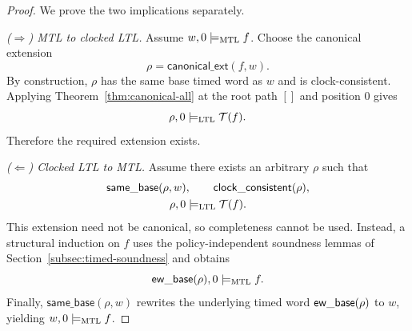 \begin{proof}
We prove the two implications separately.

\smallskip
\noindent\emph{($\Rightarrow$) MTL to clocked LTL.}
Assume $w,0\models_{\mathrm{MTL}} f$.  Choose the canonical extension
\[
  \rho=\mathsf{canonical\_ext}(f,w).
\]
By construction, $\rho$ has the same base timed word as $w$ and is
clock-consistent. Applying Theorem~\ref{thm:canonical-all} at the root path $[]$ and
position $0$ gives
\[
  \rho,0\models_{\mathrm{LTL}}\mathcal{T}(f).
\]
Therefore the required extension exists.

\smallskip
\noindent\emph{($\Leftarrow$) Clocked LTL to MTL.}
Assume there exists an arbitrary $\rho$ such that
\[
\begin{gathered}
  \mathsf{same\_base}(\rho,w),\qquad
  \mathsf{clock\_consistent}(\rho),\\
  \rho,0\models_{\mathrm{LTL}}\mathcal{T}(f).
\end{gathered}
\]
This extension need not be canonical, so completeness cannot be used.  Instead, a
structural induction on $f$ uses the policy-independent soundness lemmas of
Section~\ref{subsec:timed-soundness} and obtains
\[
  \mathsf{ew\_base}(\rho),0\models_{\mathrm{MTL}} f.
\]
Finally, $\mathsf{same\_base}(\rho,w)$ rewrites the underlying timed word
$\mathsf{ew\_base}(\rho)$ to $w$, yielding $w,0\models_{\mathrm{MTL}} f$.
\end{proof}
